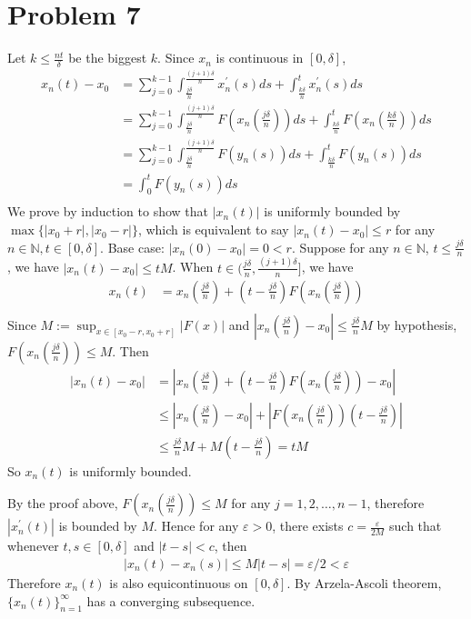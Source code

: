 \documentclass{report}
\def\ve{\varepsilon}
\def\abs#1{\left| #1 \right|}
\begin{document}
    \section*{Problem 7}
    Let $k \le \frac{nt}{\delta}$ be the biggest $k$. Since $x_n$ is continuous in $[0, \delta]$,
    \begin{align*}
        x_n(t) - x_0 &= \sum_{j=0}^{k-1} \int_{\frac{j\delta}{n}}^{\frac{(j+1)\delta}{n}}
            x_n^\prime(s)ds + \int_{\frac{k\delta}{n}}^{t} x_n^\prime(s)ds \\
        &= \sum_{j=0}^{k-1} \int_{\frac{j\delta}{n}}^{\frac{(j+1)\delta}{n}}
        F(x_n(\frac{j\delta}{n}))ds + \int_{\frac{k\delta}{n}}^{t} F(x_n(\frac{k\delta}{n}))ds \\
        &= \sum_{j=0}^{k-1} \int_{\frac{j\delta}{n}}^{\frac{(j+1)\delta}{n}}
        F(y_n(s))ds + \int_{\frac{k\delta}{n}}^{t} F(y_n(s))ds \\
        &= \int_{0}^{t} F(y_n(s))ds \\
    \end{align*}
    We prove by induction to show that $|x_n(t)|$ is uniformly bounded by 
    $\max\{|x_0+r|, |x_0-r|\}$, which is equivalent to say $\abs{x_n(t) - x_0} \le r$
    for any $n\in \mathbb{N}, t \in [0, \delta]$.
    Base case: $|x_n(0) - x_0| = 0 < r$.
    Suppose for any $n \in \mathbb{N}$, $t \le \frac{j\delta}{n}$, we have 
    $|x_n(t) - x_0| \le tM$. When $t \in (\frac{j\delta}{n}, \frac{(j+1)\delta}{n}]$,
    we have 
    \begin{align*}
        x_n(t) &= x_n(\frac{j\delta}{n}) + (t - \frac{j\delta}{n}) F(x_n(\frac{j\delta}{n})) \\
    \end{align*}
    Since $M := \sup_{x \in [x_0 - r, x_0 + r]} |F(x)|$ and  
    $\abs{x_n(\frac{j\delta}{n}) - x_0} \le \frac{j\delta}{n}M$
     by hypothesis, $F(x_n(\frac{j\delta}{n})) \le M$. Then 
    \begin{align*}
        |x_n(t)-x_0| &= \abs{x_n(\frac{j\delta}{n}) + 
                (t - \frac{j\delta}{n}) F(x_n(\frac{j\delta}{n})) - x_0} \\
            &\le
             \abs{x_n(\frac{j\delta}{n})-x_0} + \abs{F(x_n(\frac{j\delta}{n})) 
                (t - \frac{j\delta}{n})} \\
            &\le \frac{j\delta}{n}M + M(t - \frac{j\delta}{n}) = tM
    \end{align*}
    So $x_n(t)$ is uniformly bounded.
    
    By the proof above, $F(x_n(\frac{j\delta}{n})) \le M$ for any $j=1,2,\ldots,n-1$, 
    therefore $|x_n^\prime(t)|$ is bounded by $M$. Hence for any $\ve > 0$, there exists 
    $c = \frac{\ve}{2M}$ such that whenever $t, s \in [0, \delta]$ and $|t-s| < c$, then
    \begin{align*}
        \abs{x_n(t) - x_n(s)} \le M |t-s| = \ve / 2 < \ve
    \end{align*}
    Therefore $x_n(t)$ is also equicontinuous on $[0, \delta]$.
    By Arzela-Ascoli theorem, $\{x_n(t)\}_{n=1}^\infty$ has a converging subsequence.

    
\end{document}
